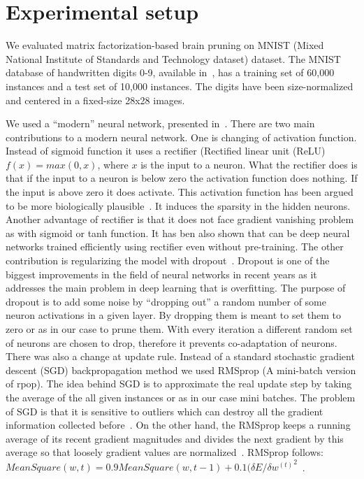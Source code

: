 \documentclass{article} %
\begin{document}
\section{Experimental setup}
We evaluated matrix factorization-based brain pruning on MNIST (Mixed National 
Institute of Standards and Technology dataset) dataset. The MNIST database of 
handwritten digits 0-9, available in~\cite{lecun-mnisthandwrittendigit-2010}, 
has a training set of 60,000 instances and a test set of 10,000 instances. The 
digits have been size-normalized and centered in a fixed-size 28x28 images. 

We used a “modern” neural network, presented in~\cite{github}. There are two 
main contributions to a modern neural network. One is changing of activation 
function. Instead of sigmoid function it uses a rectifier (Rectified linear unit 
(ReLU) $f(x) = max(0, x)$, where $x$ is the input to a neuron. What the 
rectifier does is that if the input to a neuron is below zero the activation 
function does nothing. If the input is above zero it does activate. This 
activation function has been argued to be more biologically 
plausible~\cite{AISTATS2011_GlorotBB11}. It induces the sparsity in the hidden 
neurons. Another advantage of rectifier is that it does not face gradient 
vanishing problem as with sigmoid or tanh function. It has ben also shown that 
can be deep neural networks trained efficiently using rectifier even without 
pre-training. The other contribution is regularizing the model with 
dropout~\cite{srivastava2014dropout}. Dropout is one of the biggest improvements 
in the field of neural networks in recent years as it addresses the main problem 
in deep learning that is overfitting. The purpose of dropout is to add some 
noise by “dropping out” a random number of some neuron activations in a given 
layer. By dropping them is meant to set them to zero or as in our case to prune 
them. With every iteration a different random set of neurons are chosen to drop, 
therefore it prevents co-adaptation of neurons. 
There was also a change at update rule. Instead of a standard stochastic 
gradient descent (SGD) backpropagation method we used RMSprop (A mini-batch 
version of rpop). The idea behind SGD is to approximate the real update step by 
taking the average of the all given instances or as in our case mini batches. 
The problem of SGD is that it is sensitive to outliers which can destroy all the 
gradient information collected before~\cite{erogol}. On the other hand, the 
RMSprop keeps a running average of its recent gradient magnitudes and divides 
the next gradient by this average so that loosely gradient values are 
normalized~\cite{lecture}. RMSprop follows: 
$MeanSquare(w, t) = 0.9 MeanSquare(w, t-1) + 0.1 {({\delta E}/{\delta 
w^{(t)}}}^2$~\cite{lecture}.
\end{document}
